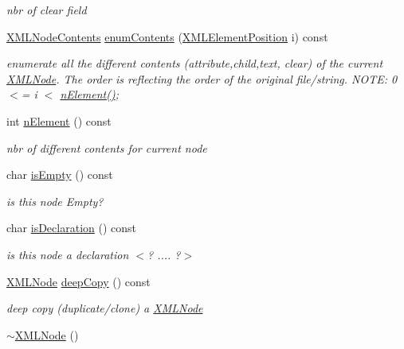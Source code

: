 \begin{DoxyCompactItemize}
\begin{DoxyCompactList}\small\item\em nbr of clear field \end{DoxyCompactList}\item 
\hyperlink{structXMLNodeContents}{X\-M\-L\-Node\-Contents} \hyperlink{group__navigate_gaf56414ef38a13892afc4f22177a7760a}{enum\-Contents} (\hyperlink{xmlParser_8h_aab10d65aadeca1f026f6416becde7432}{X\-M\-L\-Element\-Position} i) const 
\begin{DoxyCompactList}\small\item\em enumerate all the different contents (attribute,child,text, clear) of the current \hyperlink{structXMLNode}{X\-M\-L\-Node}. The order is reflecting the order of the original file/string. N\-O\-T\-E\-: 0 $<$= i $<$ \hyperlink{group__navigate_ga8e9538deb9144dcab39b3a510a8202f1}{n\-Element()}; \end{DoxyCompactList}\item 
int \hyperlink{group__navigate_ga8e9538deb9144dcab39b3a510a8202f1}{n\-Element} () const 
\begin{DoxyCompactList}\small\item\em nbr of different contents for current node \end{DoxyCompactList}\item 
char \hyperlink{group__navigate_ga764ce0ff117af3e30ab0959114d36f9c}{is\-Empty} () const 
\begin{DoxyCompactList}\small\item\em is this node Empty? \end{DoxyCompactList}\item 
char \hyperlink{group__navigate_ga71df27d54a2dc09b0a456406a7e8c6d3}{is\-Declaration} () const 
\begin{DoxyCompactList}\small\item\em is this node a declaration $<$? .... ?$>$ \end{DoxyCompactList}\item 
\hyperlink{structXMLNode}{X\-M\-L\-Node} \hyperlink{group__navigate_gadb69f8d2db5997d84590ce3380e210f1}{deep\-Copy} () const 
\begin{DoxyCompactList}\small\item\em deep copy (duplicate/clone) a \hyperlink{structXMLNode}{X\-M\-L\-Node} \end{DoxyCompactList}\item 
\hyperlink{structXMLNode_ae652023d7f98430de2027471ef9d9065}{$\sim$\-X\-M\-L\-Node} ()
\item 

\end{DoxyCompactItemize}
